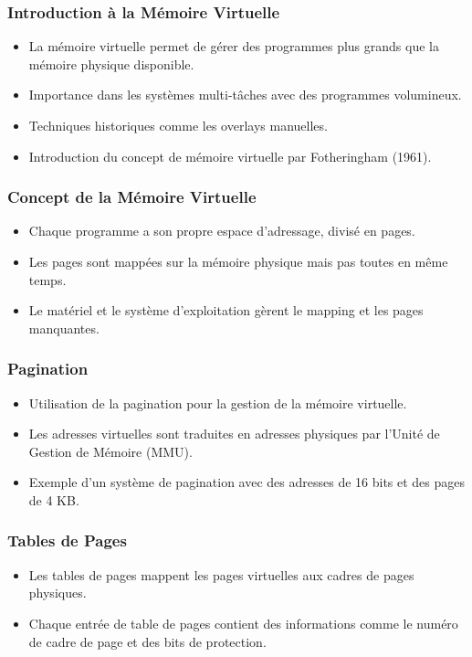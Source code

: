 \documentclass[10pt]{beamer}
\begin{document}
\begin{frame}
    \frametitle{Introduction à la Mémoire Virtuelle}
    \begin{itemize}
        \item La mémoire virtuelle permet de gérer des programmes plus grands
              que
              la mémoire physique disponible.
        \item Importance dans les systèmes multi-tâches avec des programmes
              volumineux.
        \item Techniques historiques comme les overlays manuelles.
        \item Introduction du concept de mémoire virtuelle par Fotheringham
              (1961).
    \end{itemize}
\end{frame}

\begin{frame}
    \frametitle{Concept de la Mémoire Virtuelle}
    \begin{itemize}
        \item Chaque programme a son propre espace d'adressage, divisé en
              pages.
        \item Les pages sont mappées sur la mémoire physique mais pas toutes en
              même temps.
        \item Le matériel et le système d'exploitation gèrent le mapping et les
              pages manquantes.
    \end{itemize}
\end{frame}

\begin{frame}
    \frametitle{Pagination}
    \begin{itemize}
        \item Utilisation de la pagination pour la gestion de la mémoire
              virtuelle.
        \item Les adresses virtuelles sont traduites en adresses physiques par
              l'Unité de Gestion de Mémoire (MMU).
        \item Exemple d'un système de pagination avec des adresses de 16 bits
              et
              des pages de 4 KB.
    \end{itemize}
\end{frame}

\begin{frame}
    \frametitle{Tables de Pages}
    \begin{itemize}
        \item Les tables de pages mappent les pages virtuelles aux cadres de
              pages
              physiques.
        \item Chaque entrée de table de pages contient des informations comme
              le
              numéro de cadre de page et des bits de protection.
    \end{itemize}
\end{frame}
\end{document}

